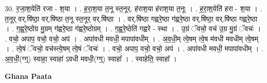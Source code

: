 \documentclass[17pt]{extarticle}
\begin{document}
30. र॒जा॒श॒येति॑ रजा - श॒या । . ह॒रा॒श॒या त॒नू स्त॒नूर्. ह॑राश॒या ह॑राश॒या त॒नूः । . ह॒रा॒श॒येति॑ हरा - श॒या । . त॒नूर् वर्.षि॑ष्ठा॒ वर्.षि॑ष्ठा त॒नू स्त॒नूर् वर्.षि॑ष्ठा । . वर्.षि॑ष्ठा गह्वरे॒ष्ठा ग॑ह्वरे॒ष्ठा वर्.षि॑ष्ठा॒ वर्.षि॑ष्ठा गह्वरे॒ष्ठा । . ग॒ह्व॒रे॒ष्ठोग्र मु॒ग्रम् ग॑ह्वरे॒ष्ठा ग॑ह्वरे॒ष्ठोग्रम् । . ग॒ह्व॒रे॒ष्ठेति॑ गह्वरे - स्था । . उ॒ग्रं ॅवचो॒ वच॑ उ॒ग्र मु॒ग्रं ॅवचः॑ । . वचो॒ अपाप॒ वचो॒ वचो॒ अप॑ । . अपा॑वधी मवधी॒ मपापा॑वधीम् । . अ॒व॒धी॒म् त्वे॒षम् त्वे॒ष म॑वधी मवधीम् त्वे॒षम् । . त्वे॒षं ॅवचो॒ वच॑स्त्वे॒षम् त्वे॒षं ॅवचः॑ । . वचो॒ अपाप॒ वचो॒ वचो॒ अप॑ । . अपा॑वधी मवधी॒ मपापा॑वधीम् । . अ॒व॒धी॒(ग्ग्॒) स्वाहा॒ स्वाहा॑ ऽवधी मवधी॒(ग्ग्॒) स्वाहा᳚ । . स्वाहेति॒ स्वाहा᳚ । \newline

\textbf{Ghana Paata } \newline
\end{document}
